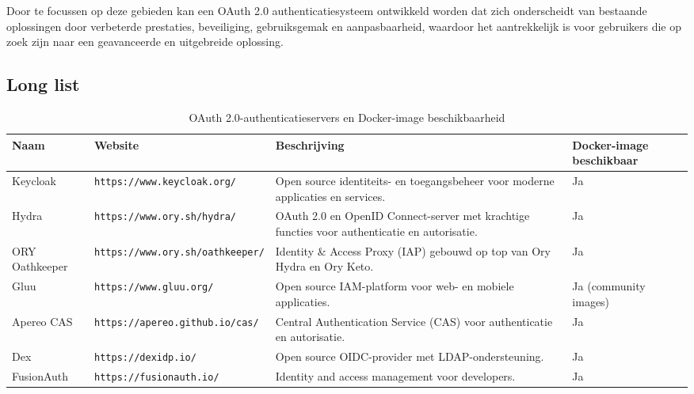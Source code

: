 Door te focussen op deze gebieden kan een OAuth 2.0 authenticatiesysteem ontwikkeld worden dat zich onderscheidt van bestaande oplossingen door verbeterde prestaties, beveiliging, gebruiksgemak en aanpasbaarheid, waardoor het aantrekkelijk is voor gebruikers die op zoek zijn naar een geavanceerde en uitgebreide oplossing.

\subsection{Long list}%
\label{subsec:long-list}
\begin{table}[htbp]
  \centering
  \caption{OAuth 2.0-authenticatieservers en Docker-image beschikbaarheid}
  \label{tab:oauth_servers}
  \begin{adjustbox}{width=1\textwidth}
  \begin{tabular}{@{}llll@{}}
    \toprule
    Naam          & Website                               & Beschrijving                                                                   & Docker-image beschikbaar \\ \midrule
    Keycloak      & \texttt{https://www.keycloak.org/}     & Open source identiteits- en toegangsbeheer voor moderne applicaties en services. & Ja                        \\
    Hydra         & \texttt{https://www.ory.sh/hydra/}     & OAuth 2.0 en OpenID Connect-server met krachtige functies voor authenticatie en autorisatie. & Ja                        \\
    ORY Oathkeeper & \texttt{https://www.ory.sh/oathkeeper/} & Identity \& Access Proxy (IAP) gebouwd op top van Ory Hydra en Ory Keto. & Ja                        \\
    Gluu          & \texttt{https://www.gluu.org/}         & Open source IAM-platform voor web- en mobiele applicaties.                   & Ja (community images)    \\
    Apereo CAS    & \texttt{https://apereo.github.io/cas/} & Central Authentication Service (CAS) voor authenticatie en autorisatie.      & Ja                        \\
    Dex           & \texttt{https://dexidp.io/}            & Open source OIDC-provider met LDAP-ondersteuning.                             & Ja                        \\
    FusionAuth    & \texttt{https://fusionauth.io/}        & Identity and access management voor developers.                               & Ja                        \\

\end{tabular}
\end{adjustbox}
\end{table}
